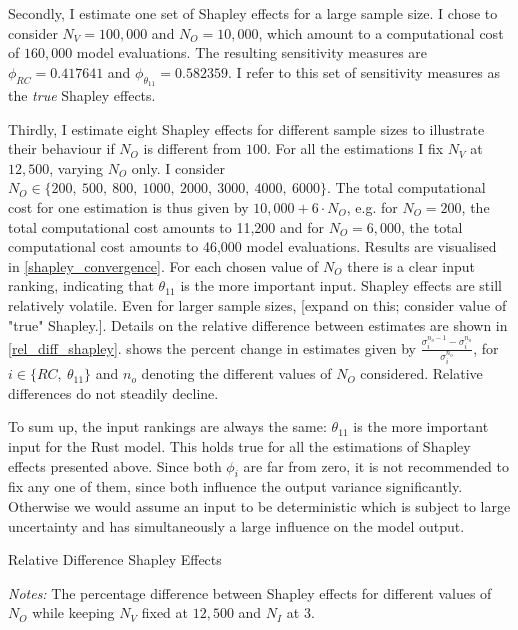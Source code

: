 
Secondly, I estimate one set of Shapley effects for a large sample size. I chose to consider $N_V=100,000$ and $N_O=10,000$, which amount to a computational cost of $160,000$ model evaluations. The resulting sensitivity measures are $\phi_{RC} = 0.417641$ and $\phi_{\theta_{11}} = 0.582359$. I refer to this set of sensitivity measures as the \textit{true} Shapley effects.


Thirdly, I estimate eight Shapley effects for different sample sizes to illustrate their behaviour if $N_O$ is different from $100$. For all the estimations I fix $N_V$ at $12,500$, varying $N_O$ only. I consider $N_O \in \{200,\ 500,\ 800,\ 1000,\ 2000,\ 3000,\ 4000,\ 6000 \}$. The total computational cost for one estimation is thus given by $10,000 + 6 \cdot N_O$, e.g. for $N_O=200$, the total computational cost amounts to 11,200 and for $N_O=6,000$, the total computational cost amounts to 46,000 model evaluations. Results are visualised in \cref{shapley_convergence}. For each chosen value of $N_O$ there is a clear input ranking, indicating that $\theta_{11}$ is the more important input. Shapley effects are still relatively volatile. Even for larger sample sizes, [expand on this; consider value of "true" Shapley.]. Details on the relative difference between estimates are shown in \cref{rel_diff_shapley}.  shows the percent change in estimates given by $\frac{\sigma_i^{n_o-1} - \sigma_i^{n_o}}{\sigma_i^{n_o}}$, for $i \in \{RC,\ \theta_{11}\}$ and $n_o$ denoting the different values of $N_O$ considered. Relative differences do not steadily decline.


To sum up, the input rankings are always the same: $\theta_{11}$ is the more important input for the Rust model. This holds true for all the estimations of Shapley effects presented above. Since both $\phi_i$ are far from zero, it is not recommended to fix any one of them, since both influence the output variance significantly. Otherwise we would assume an input to be deterministic which is subject to large uncertainty and has simultaneously a large influence on the model output.

\begin{table}[t]
	\centering
	\caption{Relative Difference Shapley Effects}
	\label{rel_diff_shapley}
	\begin{threeparttable}
	\centering
	
	\begin{tablenotes}
	\small
	\item \textit{Notes:} The percentage difference between Shapley effects for different values of $N_O$ while keeping $N_V$ fixed at $12,500$ and $N_I$ at $3$.
	\end{tablenotes}
	\end{threeparttable}
\end{table}